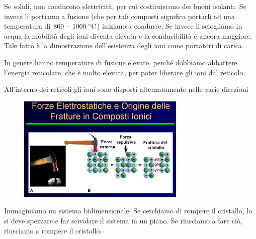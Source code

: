 Se solidi, non conducono elettricità, per cui costituiscono dei buoni isolanti. Se invece li portiamo a fusione (che per tali composti significa portarli ad una temperatura di $800-1000 \; ^{\circ} \rm C$) iniziano a condurre. Se invece li sciogliamo in acqua la mobilità degli ioni diventa elevata e la conducibilità è ancora maggiore. Tale fatto è la dimostrazione dell'esistenza degli ioni come portatori di carica.

In genere hanno temperature di fusione elevate, perché dobbiamo abbattere l'energia reticolare, che è molto elevata, per poter liberare gli ioni dal reticolo.

All'interno dei reticoli gli ioni sono disposti alternatamente nelle varie direzioni

\begin{figure}[H]
    \centering
    \includegraphics[width=8cm]{immagini/struttura-composti-ionici.png}
\end{figure}

Immaginiamo un sistema bidimensionale. Se cerchiamo di rompere il cristallo, lo si deve spezzare e far scivolare il sistema in un piano. Se riusciamo a fare ciò, riusciamo a rompere il cristallo.